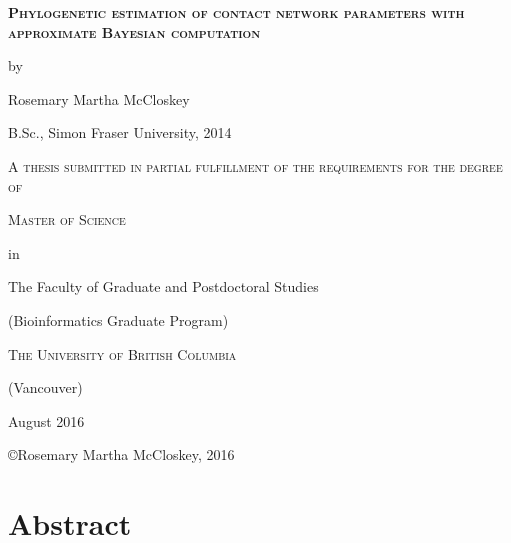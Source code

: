 



\newcommand{\titlesize}{\Large}
\newcommand{\subtitlesize}{\large}
\newcommand{\titlebigsep}{1.25cm}
\newcommand{\titlesmallsep}{0.75cm}
\begin{titlepage}
  \centering
  {\scshape\titlesize\bfseries Phylogenetic estimation of contact network parameters
  with approximate Bayesian computation \par}
  \vspace{\titlesmallsep}
  {\subtitlesize by\par}
  \vspace{\titlesmallsep}
  {\subtitlesize Rosemary Martha McCloskey \par}
  \vspace{\titlesmallsep}
  {\subtitlesize B.Sc., Simon Fraser University, 2014 \par}
  \vspace{\titlebigsep}
  {\scshape\subtitlesize A thesis submitted in partial fulfillment of the requirements
  for the degree of \par}
  \vspace{\titlesmallsep}
  {\scshape\subtitlesize Master of Science \par}
  \vspace{\titlesmallsep}
  {\subtitlesize in \par}
  \vspace{\titlesmallsep}
  {\subtitlesize The Faculty of Graduate and Postdoctoral Studies \par}
  \vspace{\titlesmallsep}
  {\subtitlesize (Bioinformatics Graduate Program) \par}
  \vspace{\titlebigsep}
  {\scshape \subtitlesize The University of British Columbia \par}
  {\subtitlesize (Vancouver) \par}
  \vspace{\titlesmallsep}
  {\subtitlesize August 2016 \par}
  \vfill
  {\subtitlesize\copyright Rosemary Martha McCloskey, 2016\par}
\end{titlepage}

\setcounter{page}{2}
\chapter*{Abstract}

\newpage

